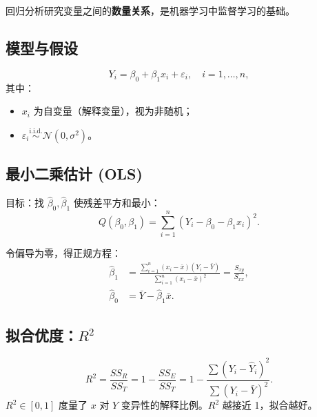 回归分析研究变量之间的\textbf{数量关系}，是机器学习中监督学习的基础。

\subsection{模型与假设}

\begin{definition}[一元线性回归模型]
\begin{equation}
    Y_i = \beta_0 + \beta_1 x_i + \varepsilon_i, \quad i = 1,\dots,n,
\end{equation}
其中：
\begin{itemize}
    \item $x_i$ 为自变量（解释变量），视为非随机；
    \item $\varepsilon_i \stackrel{\mathrm{i.i.d.}}{\sim} \mathcal{N}(0, \sigma^2)$。
\end{itemize}
\end{definition}

\subsection{最小二乘估计 (OLS)}

目标：找 $\hat{\beta}_0, \hat{\beta}_1$ 使残差平方和最小：
\begin{equation}
    Q(\beta_0, \beta_1) = \sum_{i=1}^{n} (Y_i - \beta_0 - \beta_1 x_i)^2.
\end{equation}

令偏导为零，得正规方程：
\begin{align}
    \hat{\beta}_1 &= \frac{\sum_{i=1}^{n} (x_i - \bar{x})(Y_i - \bar{Y})}
                          {\sum_{i=1}^{n} (x_i - \bar{x})^2}
                   = \frac{S_{xy}}{S_{xx}}, \\
    \hat{\beta}_0 &= \bar{Y} - \hat{\beta}_1 \bar{x}.
\end{align}

\subsection{拟合优度：$R^2$}

\begin{definition}[决定系数]
\begin{equation}
    R^2 = \frac{SS_R}{SS_T}
         = 1 - \frac{SS_E}{SS_T}
         = 1 - \frac{\sum (Y_i - \hat{Y}_i)^2}{\sum (Y_i - \bar{Y})^2}.
\end{equation}
$R^2 \in [0,1]$ 度量了 $x$ 对 $Y$ 变异性的解释比例。$R^2$ 越接近 1，拟合越好。
\end{definition}

